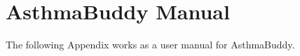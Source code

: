 \chapter{AsthmaBuddy Manual}
\label{app:asthmabuddy_manual}


The following Appendix works as a user manual for AsthmaBuddy.